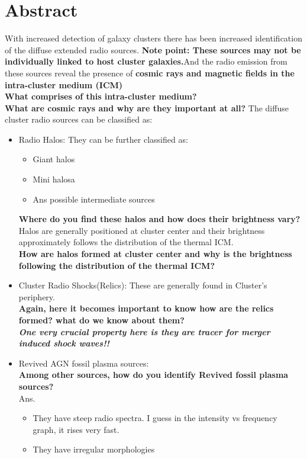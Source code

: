 \documentclass[12pt]{report}
\begin{document}
\section{Abstract}
With increased detection of galaxy clusters there has been increased identification of the diffuse extended radio sources. \textbf{Note point: These sources may not be individually linked to host cluster galaxies.}And the radio emission from these sources reveal the presence of \textbf{cosmic rays and magnetic fields in the intra-cluster medium (ICM)}\\
\textbf{What comprises of this intra-cluster medium?}\\
\textbf{What are cosmic rays and why are they important at all?}
The diffuse cluster radio sources can be classified as:
\begin{itemize}
\item Radio Halos: They can be further classified as:
\begin{itemize}
\item Giant halos
\item Mini halosa
\item Ans possible intermediate sources
\end{itemize}
\textbf{Where do you find these halos and how does their brightness vary?}\\
 Halos are generally positioned at cluster center and their brightness approximately follows the distribution of the thermal ICM.\\
 \textbf{How are halos formed at cluster center and why is the brightness following the distribution of the thermal ICM?}\\
\item Cluster Radio Shocks(Relics): These are generally found in Cluster's periphery.\\
\textbf{Again, here it becomes important to know how are the relics formed? what do we know about them?}\\
\textbf{\textit{One very crucial property here is they are tracer for merger induced shock waves!!}}
\item Revived AGN fossil plasma sources:\\
\textbf{Among other sources, how do you identify Revived fossil plasma sources?}\\
Ans. \begin{itemize}
\item They have steep radio spectra. I guess in the intensity vs frequency graph, it rises very fast.
\item They have irregular morphologies
\end{itemize}
\end{itemize}
\end{document}
